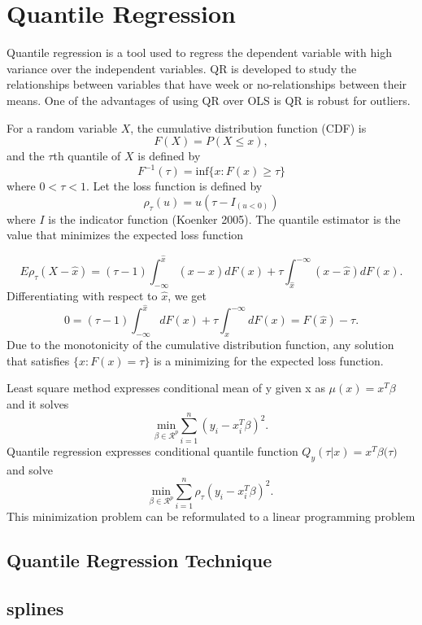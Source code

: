 \documentclass[
  12pt,
]{article}
\begin{document}
\section{Quantile Regression}

Quantile regression is a tool used to regress the dependent variable with high variance over the independent variables. QR is developed to study the relationships between variables that have week or no-relationships between their means. One of the advantages of using QR over OLS is QR is robust for outliers.

For a random variable \(X\), the cumulative distribution function (CDF) is \[F(X)=P(X\leq x),\] and the \(\tau\)th quantile of \(X\) is defined by \[ F^{-1}(\tau)=\text{inf}\{x: F(x)\ge \tau\} \] where \(0<\tau<1\).
Let the loss function is defined by \[\rho_{\tau}(u)= u(\tau-I_{(u<0)})\] where \(I\) is the indicator function (Koenker 2005). The quantile estimator is the value that minimizes the expected loss function

\[E\rho_{\tau}(X-\hat{x})=(\tau-1)\int_{-\infty}^{\hat{x}} (x-\hat{x})dF(x)+\tau\int_{\hat{x}}^{-\infty} (x-\hat{x})dF(x).\]
Differentiating with respect to \(\hat{x}\), we get
\[ 0  =(\tau-1)\int_{-\infty}^{\hat{x}} dF(x)+\tau\int_{\hat{x}}^{-\infty} dF(x)
=F(\hat{x})-\tau.\]
Due to the monotonicity of the cumulative distribution function, any solution that satisfies \(\{x:F(x)=\tau \}\) is a minimizing for the expected loss function.

Least square method expresses conditional mean of y given x as \(\mu(x)=x^T\beta\) and it solves \[ \underset{\beta\in \mathcal{R}^p}{\text{min}}\sum_{i=1}^n(y_i- x_i^T\beta)^2.\] Quantile regression expresses conditional quantile function \(Q_y(\tau|x)=x^T \beta ({\tau)}\) and solve \[ \underset{\beta\in \mathcal{R}^p}{\text{min}}\sum_{i=1}^n\rho_{\tau}(y_i- x_i^T\beta)^2.\]This minimization problem can be reformulated to a linear programming problem

\subsection{Quantile Regression Technique }

\subsection{splines}
\end{document}
